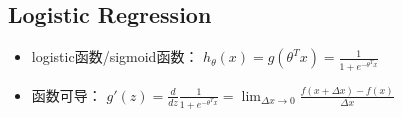 \documentclass[10pt,a4paper]{ctexbook}
\begin{document}

\subsection{Logistic Regression}

\begin{itemize}
\item logistic函数/sigmoid函数： $h_{\theta}(x)=g({\theta}^Tx)={\frac {1}{1+e^{-\theta^Tx}}}$ 
\item 函数可导：
$g'(z)={\frac {d}{dz}}{\frac {1}{1+e^{-\theta^Tx}}}=\lim_{{\Delta x}\to 0}{\frac {f(x+{\Delta x})-f(x)}{\Delta x}}$
\end{itemize}
\end{document}
